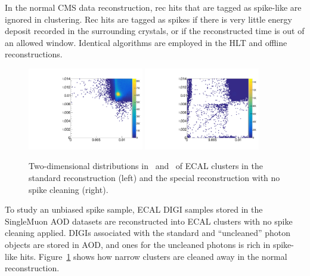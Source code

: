In the normal CMS data reconstruction, rec hits that are tagged as spike-like are ignored in clustering. 
Rec hits are tagged as spikes if there is very little energy deposit recorded in the surrounding crystals, or if the reconstructed time is out of an allowed window.
Identical algorithms are employed in the HLT and offline reconstructions.

\begin{figure}[tbp]
  \begin{center}
    \includegraphics[width=0.45\textwidth]{Reconstruction/Figures/spikes/showershapes_standard.pdf}
    \includegraphics[width=0.45\textwidth]{Reconstruction/Figures/spikes/showershapes_uncleaned.pdf}
    \caption{
      Two-dimensional distributions in \sipip\ and \sieie\ of ECAL clusters in the standard reconstruction (left) and the special reconstruction with no spike cleaning (right).
    }
    \label{fig:showershape_map}
  \end{center}
\end{figure}

To study an unbiased spike sample, ECAL DIGI samples stored in the SingleMuon AOD datasets are reconstructed into ECAL clusters with no spike cleaning applied. 
DIGIs associated with the standard and ``uncleaned'' photon objects are stored in AOD, and ones for the uncleaned photons is rich in spike-like hits. 
Figure~\ref{fig:showershape_map} shows how narrow clusters are cleaned away in the normal reconstruction.

